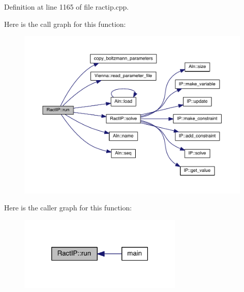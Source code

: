 Definition at line 1165 of file ractip.\+cpp.



Here is the call graph for this function\+:
\nopagebreak
\begin{figure}[H]
\begin{center}
\leavevmode
\includegraphics[width=350pt]{class_ract_i_p_a1b9280130942c2ee4fe22ff9288c57fa_cgraph}
\end{center}
\end{figure}




Here is the caller graph for this function\+:
\nopagebreak
\begin{figure}[H]
\begin{center}
\leavevmode
\includegraphics[width=222pt]{class_ract_i_p_a1b9280130942c2ee4fe22ff9288c57fa_icgraph}
\end{center}
\end{figure}


